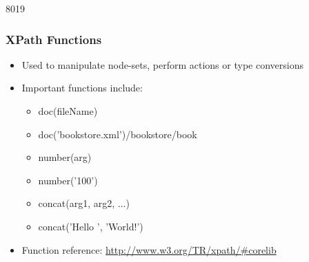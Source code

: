 \begin{slide}[fragile]{8019}
\frametitle{XPath Functions}
\begin{itemize}
\item Used to manipulate node-sets, perform actions or type conversions
\item Important functions include:
\begin{itemize}
 \item doc(fileName)
 \item[]
 \begin{xml}
  doc('bookstore.xml')/bookstore/book
 \end{xml}
 \item number(arg)
 \item[]
 \begin{xml}
  number('100')
 \end{xml}
 \item concat(arg1, arg2, ...)
 \item[]
 \begin{xml}
  concat('Hello ', 'World!')
 \end{xml}
\end{itemize}
\item Function reference: \url{http://www.w3.org/TR/xpath/#corelib}
\end{itemize}
\end{slide}


